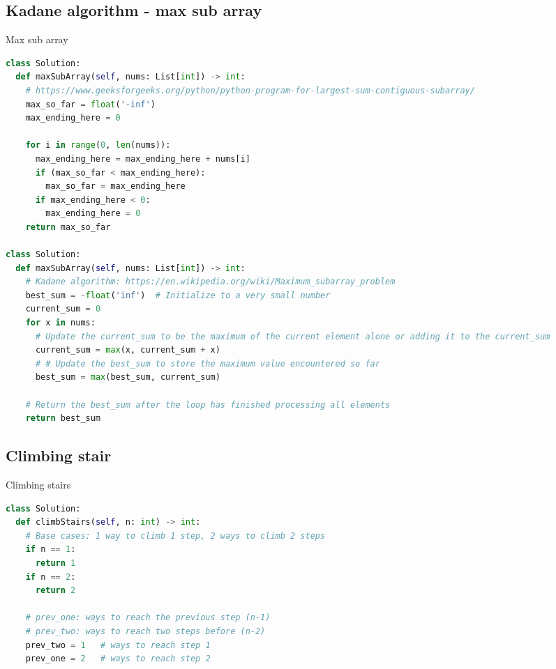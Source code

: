 \documentclass[a4paper,12pt]{article}
\begin{document}
\begin{multicols}{2}
\subsection{Kadane algorithm - max sub array}

\begin{mycode}[label={lst:max-sub-array}]{Max sub array}
\begin{lstlisting}[language=Python]
class Solution:
  def maxSubArray(self, nums: List[int]) -> int:
    # https://www.geeksforgeeks.org/python/python-program-for-largest-sum-contiguous-subarray/
    max_so_far = float('-inf')
    max_ending_here = 0
     
    for i in range(0, len(nums)):
      max_ending_here = max_ending_here + nums[i]
      if (max_so_far < max_ending_here):
        max_so_far = max_ending_here
      if max_ending_here < 0:
        max_ending_here = 0   
    return max_so_far

class Solution:
  def maxSubArray(self, nums: List[int]) -> int:
    # Kadane algorithm: https://en.wikipedia.org/wiki/Maximum_subarray_problem
    best_sum = -float('inf')  # Initialize to a very small number
    current_sum = 0
    for x in nums:
      # Update the current_sum to be the maximum of the current element alone or adding it to the current_sum
      current_sum = max(x, current_sum + x)
      # # Update the best_sum to store the maximum value encountered so far
      best_sum = max(best_sum, current_sum)
    
    # Return the best_sum after the loop has finished processing all elements
    return best_sum
\end{lstlisting}
\end{mycode}

\subsection{Climbing stair}

\begin{mycode}[label={lst:climbing-stairs}]{Climbing stairs}
\begin{lstlisting}[language=Python]
class Solution:
  def climbStairs(self, n: int) -> int:
    # Base cases: 1 way to climb 1 step, 2 ways to climb 2 steps
    if n == 1:
      return 1
    if n == 2:
      return 2

    # prev_one: ways to reach the previous step (n-1)
    # prev_two: ways to reach two steps before (n-2)
    prev_two = 1   # ways to reach step 1
    prev_one = 2   # ways to reach step 2


\end{lstlisting}
\end{mycode}
\end{multicols}
\end{document}
